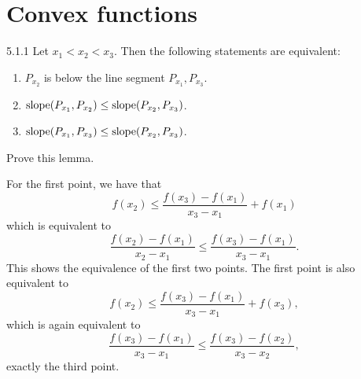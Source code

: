 \section{Convex functions}

\begin{manuallemma}{5.1.1}
  Let $x_1 < x_2 < x_3$.
  Then the following statements are equivalent:
 \begin{enumerate}
   \item $P_{x_2}$ is below the line segment $P_{x_1}, P_{x_3}$.

    \item $\operatorname*{slope}( P_{x_1}, P_{x_2} ) \leq \operatorname*{slope}( P_{x_2}, P_{x_3} )$.

    \item $\operatorname*{slope}( P_{x_1}, P_{x_3} ) \leq \operatorname*{slope}( P_{x_2}, P_{x_3} )$.
  \end{enumerate} 
\end{manuallemma}

\begin{exercise}
  Prove this lemma.
\end{exercise}

\begin{solution}
  For the first point, we have that
  \begin{equation}
    f(x_2)
    \leq
    \frac{f(x_3) - f(x_1)}{x_3 - x_1}
    + f(x_1)
  \end{equation}
  which is equivalent to
  \begin{equation}
    \frac{f(x_2) - f(x_1)}{x_2 - x_1}
    \leq
    \frac{f(x_3) - f(x_1)}{x_3 - x_1}.
  \end{equation}
  This shows the equivalence of the first two points.
  The first point is also equivalent to
  \begin{equation}
    f(x_2)
    \leq
    \frac{f(x_3) - f(x_1)}{x_3 - x_1}
    + f(x_3),
  \end{equation}
  which is again equivalent to
  \begin{equation}
    \frac{f(x_3) - f(x_1)}{x_3 - x_1}
    \leq
    \frac{f(x_3) - f(x_2)}{x_3 - x_2},
  \end{equation}
  exactly the third point.
\end{solution}

